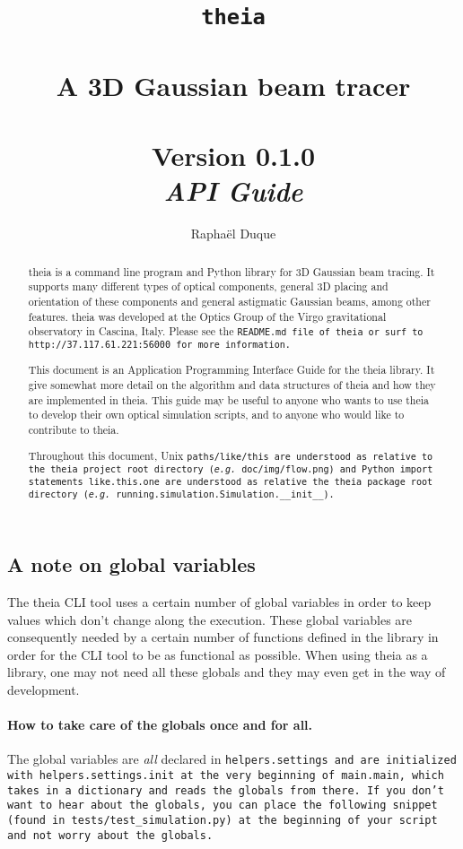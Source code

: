 \documentclass{article}
\title{\texttt{theia} \\ \quad \\A 3D Gaussian beam tracer \\ \quad \\ Version 0.1.0 \\ \textit{API Guide}}
\author{Rapha\"el Duque}
\begin{document}
\maketitle
\begin{abstract}
theia is a command line program and Python library for 3D Gaussian beam tracing. It supports many different types of optical components, general 3D placing and orientation of these components and general astigmatic Gaussian beams, among other features. theia was developed at the Optics Group of the Virgo gravitational observatory in Cascina, Italy. Please see the \tt{README.md} file of \tt{theia} or surf to \tt{http://37.117.61.221:56000} for more information.

This document is an Application Programming Interface Guide for the theia library. It give somewhat more detail on the algorithm and data structures of theia and how they are implemented in theia. This guide may be useful to anyone who wants to use theia to develop their own optical simulation scripts, and to anyone who would like to contribute to theia.

Throughout this document, Unix \tt{paths/like/this} are understood as relative to the theia project root directory (\textit{e.g.} \tt{doc/img/flow.png}) and Python import statements \tt{like.this.one} are understood as relative the theia package root directory (\textit{e.g.} \tt{running.simulation.Simulation.\_\_init\_\_}).
\end{abstract}

\tableofcontents
\newpage

\subsection{A note on global variables}
The theia CLI tool uses a certain number of global variables in order to keep values which don't change along the execution. These global variables are consequently needed by a certain number of functions defined in the library in order for the CLI tool to be as functional as possible. When using theia as a library, one may not need all these globals and they may even get in the way of development.

\paragraph{How to take care of the globals once and for all.}The global variables are \textit{all} declared in \tt{helpers.settings} and are initialized with \tt{helpers.settings.init} at the very beginning of \tt{main.main}, which takes in a dictionary and reads the globals from there. If you don't want to hear about the globals, you can place the following snippet (found in \tt{tests/test\_simulation.py}) at the beginning of your script and not worry about the globals.
\end{document}
